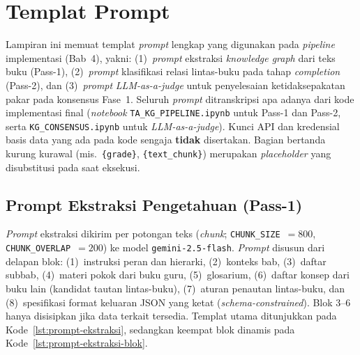 \documentclass[main]{subfiles}
\begin{document}
\ifSubfilesClassLoaded{}{\appendix\setcounter{chapter}{3}}

\chapter{Templat Prompt}
\label{lamp:prompt}

Lampiran ini memuat templat \textit{prompt} lengkap yang digunakan pada
\textit{pipeline} implementasi (Bab~4), yakni: (1)~\textit{prompt} ekstraksi
\textit{knowledge graph} dari teks buku (Pass-1), (2)~\textit{prompt}
klasifikasi relasi lintas-buku pada tahap \textit{completion} (Pass-2), dan
(3)~\textit{prompt} \textit{LLM-as-a-judge} untuk penyelesaian ketidaksepakatan
pakar pada konsensus Fase~1. Seluruh \textit{prompt} ditranskripsi apa adanya
dari kode implementasi final (\textit{notebook} \texttt{TA\_KG\_PIPELINE.ipynb}
untuk Pass-1 dan Pass-2, serta \texttt{KG\_CONSENSUS.ipynb} untuk
\textit{LLM-as-a-judge}). Kunci API dan kredensial basis data yang ada pada
kode sengaja \textbf{tidak} disertakan. Bagian bertanda kurung kurawal
(mis.\ \texttt{\{grade\}}, \texttt{\{text\_chunk\}}) merupakan \textit{placeholder}
yang disubstitusi pada saat eksekusi.

\section{Prompt Ekstraksi Pengetahuan (Pass-1)}
\label{lamp:prompt-ekstraksi}

\textit{Prompt} ekstraksi dikirim per potongan teks (\textit{chunk};
\texttt{CHUNK\_SIZE}~$=800$, \texttt{CHUNK\_OVERLAP}~$=200$) ke model
\texttt{gemini-2.5-flash}. \textit{Prompt} disusun dari delapan blok: (1)~instruksi
peran dan hierarki, (2)~konteks bab, (3)~daftar subbab, (4)~materi pokok dari
buku guru, (5)~glosarium, (6)~daftar konsep dari buku lain (kandidat tautan
lintas-buku), (7)~aturan penautan lintas-buku, dan (8)~spesifikasi format
keluaran JSON yang ketat (\textit{schema-constrained}). Blok 3--6 hanya
disisipkan jika data terkait tersedia. Templat utama ditunjukkan pada
Kode~\ref{lst:prompt-ekstraksi}, sedangkan keempat blok dinamis pada
Kode~\ref{lst:prompt-ekstraksi-blok}.
\end{document}
